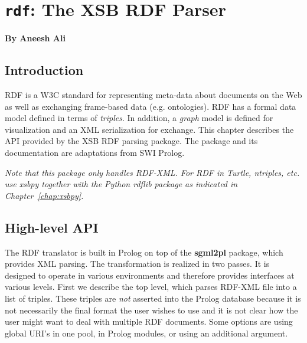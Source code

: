 
\chapter{{\tt rdf}: The XSB RDF Parser} \label{chapter:RDF}

\begin{center}
  {\Large {\bf By Aneesh Ali}}
\end{center}

\section{Introduction}

RDF is a W3C standard for representing meta-data about documents
on the Web as well as exchanging frame-based data (e.g. ontologies). RDF
has a formal
data model defined in terms of {\it triples}. In addition, a
{\it graph} model is defined for visualization and an XML serialization
for exchange.
This chapter describes the API provided by the XSB RDF parsing package.
The package and its documentation are adaptations
from SWI Prolog.

{\em Note that this package only handles RDF-XML.  For RDF in Turtle,
  ntriples, etc. use xsbpy together with the Python rdflib package as
  indicated in Chapter~\ref{chap:xsbpy}.}
  
\section{High-level API}

The RDF translator is built in Prolog on top of the {\bf sgml2pl}
package, which provides XML parsing.
The transformation is realized in two passes.
It is designed to operate in various environments and therefore
provides interfaces at various levels. First we describe the top level,
which parses RDF-XML file into a list of
triples. These triples are {\em not} asserted into the Prolog database
because it is not necessarily the final format the user wishes to use
and it is not clear how the user might want to deal with multiple RDF
documents.  Some options are using global URI's in one pool, in Prolog
modules, or using an additional argument.

